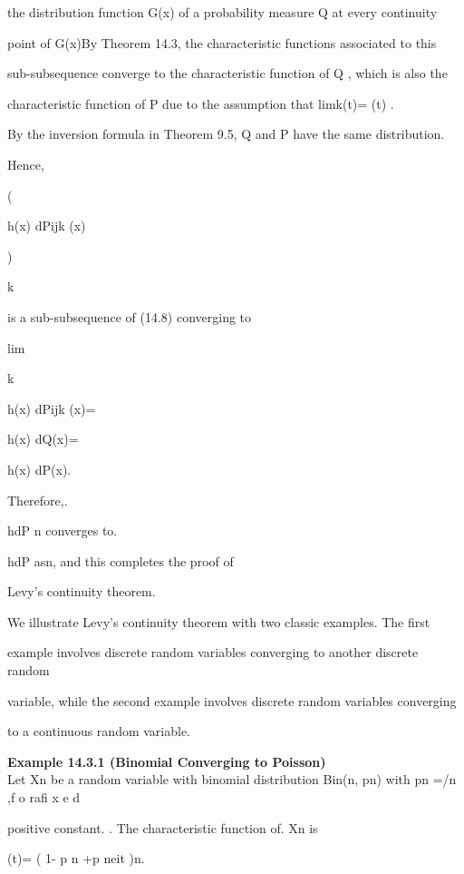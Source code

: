 the distribution function G(x) of a probability measure Q at every continuity

point of G(x)By Theorem 14.3, the characteristic functions associated to this

sub-subsequence converge to the characteristic function of Q , which is also the

characteristic function of P due to the assumption that limk\to\infty \phiijk (t)= \phi(t) .

By the inversion formula in Theorem 9.5, Q and P have the same distribution.

Hence,

( \int

h(x) dPijk (x)

)

k

is a sub-subsequence of (14.8) converging to

lim

k\to\infty

\int

h(x) dPijk (x)=

\int

h(x) dQ(x)=

\int

h(x) dP(x).

Therefore,.

\int

hdP n converges to.

\int

hdP asn\to\infty , and this completes the proof of

Levy's continuity theorem.

We illustrate Levy's continuity theorem with two classic examples. The first

example involves discrete random variables converging to another discrete random

variable, while the second example involves discrete random variables converging

to a continuous random variable.

\textbf{Example 14.3.1 (Binomial Converging to Poisson)} \\

Let Xn be a random variable with binomial distribution Bin(n, pn) with pn =\lambda/n ,f o rafi x e d

positive constant. \lambda. The characteristic function of. Xn is

\phiXn (t)= ( 1- p n +p neit )n.

